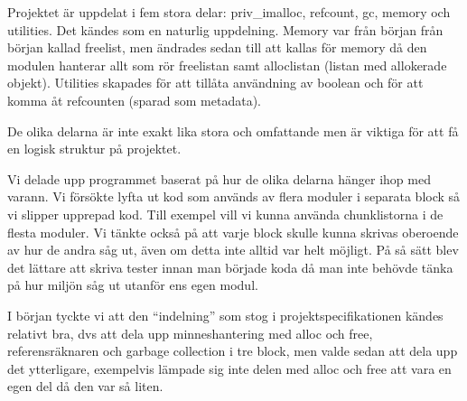







Projektet är uppdelat i fem stora delar: priv\_imalloc, refcount, gc, memory och utilities. Det kändes som en naturlig uppdelning. Memory var från början från början kallad freelist, men ändrades sedan till att kallas för memory då den modulen hanterar allt som rör freelistan samt alloclistan (listan med allokerade objekt). Utilities skapades för att tillåta användning av boolean och för att komma åt refcounten (sparad som metadata).

De olika delarna är inte exakt lika stora och omfattande men är viktiga för att få en logisk struktur på projektet.

Vi delade upp programmet baserat på hur de olika delarna hänger ihop med varann. Vi försökte lyfta ut kod som används av flera moduler i separata block så vi slipper upprepad kod. Till exempel vill vi kunna använda chunklistorna i de flesta moduler. Vi tänkte också på att varje block skulle kunna skrivas oberoende av hur de andra såg ut, även om detta inte alltid var helt möjligt. På så sätt blev det lättare att skriva tester innan man började koda då man inte behövde tänka på hur miljön såg ut utanför ens egen modul.

I början tyckte vi att den “indelning” som stog i projektspecifikationen kändes relativt bra, dvs att dela upp minneshantering med alloc och free, referensräknaren och garbage collection i tre block, men valde sedan att dela upp det ytterligare, exempelvis lämpade sig inte delen med alloc och free att vara en egen del då den var så liten.



